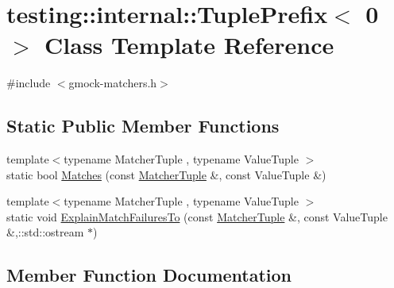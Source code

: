 \hypertarget{classtesting_1_1internal_1_1_tuple_prefix_3_010_01_4}{}\section{testing\+:\+:internal\+:\+:Tuple\+Prefix$<$ 0 $>$ Class Template Reference}
\label{classtesting_1_1internal_1_1_tuple_prefix_3_010_01_4}


{\ttfamily \#include $<$gmock-\/matchers.\+h$>$}

\subsection*{Static Public Member Functions}
\begin{DoxyCompactItemize}
\item 
{\footnotesize template$<$typename Matcher\+Tuple , typename Value\+Tuple $>$ }\\static bool \hyperlink{classtesting_1_1internal_1_1_tuple_prefix_3_010_01_4_a8bb323da9f209f4fef5d81d7c0b628e9}{Matches} (const \hyperlink{structtesting_1_1internal_1_1_matcher_tuple}{Matcher\+Tuple} \&, const Value\+Tuple \&)
\item 
{\footnotesize template$<$typename Matcher\+Tuple , typename Value\+Tuple $>$ }\\static void \hyperlink{classtesting_1_1internal_1_1_tuple_prefix_3_010_01_4_a8c86e2f864d1210f10f0faf980bc2758}{Explain\+Match\+Failures\+To} (const \hyperlink{structtesting_1_1internal_1_1_matcher_tuple}{Matcher\+Tuple} \&, const Value\+Tuple \&,\+::std\+::ostream $\ast$)
\end{DoxyCompactItemize}


\subsection{Member Function Documentation}

